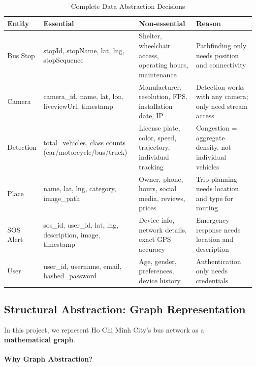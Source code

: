\begin{table}[H]
    \centering
    \renewcommand{\arraystretch}{1.3}
    \begin{tabularx}{\textwidth}{|p{2cm}|X|X|p{2.5cm}|}
        \hline
        \textbf{Entity} & \textbf{Essential} & \textbf{Non-essential} & \textbf{Reason} \\
        \hline
        Bus Stop & stopId, stopName, lat, lng, stopSequence & Shelter, wheelchair access, operating hours, maintenance & Pathfinding only needs position and connectivity \\
        \hline
        Camera & camera\_id, name, lat, lon, liveviewUrl, timestamp & Manufacturer, resolution, FPS, installation date, IP & Detection works with any camera; only need stream access \\
        \hline
        Detection & total\_vehicles, class counts (car/motorcycle/bus/truck) & License plate, color, speed, trajectory, individual tracking & Congestion = aggregate density, not individual vehicles \\
        \hline
        Place & name, lat, lng, category, image\_path & Owner, phone, hours, social media, reviews, prices & Trip planning needs location and type for routing \\
        \hline
        SOS Alert & sos\_id, user\_id, lat, lng, description, image, timestamp & Device info, network details, exact GPS accuracy & Emergency response needs location and description \\
        \hline
        User & user\_id, username, email, hashed\_password & Age, gender, preferences, device history & Authentication only needs credentials \\
        \hline
    \end{tabularx}
    \caption{Complete Data Abstraction Decisions}
    \label{tab:abstraction-complete}
\end{table}

\subsection{Structural Abstraction: Graph Representation}

 In this project, we represent Ho Chi Minh City's bus network as a \textbf{mathematical graph}.

\paragraph{Why Graph Abstraction?}

